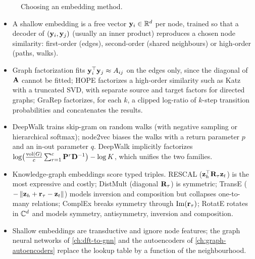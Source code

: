 \begin{notechapter}
\begin{figure}[htbp]
\caption{Choosing an embedding method.}
\end{figure}

\begin{chaptersummary}
\begin{itemize}
\item A shallow embedding is a free vector $\mathbf{y}_i \in \mathbb{R}^d$ per node, trained so that a decoder of $(\mathbf{y}_i, \mathbf{y}_j)$ (usually an inner product) reproduces a chosen node similarity: first-order (edges), second-order (shared neighbours) or high-order (paths, walks).
\item Graph factorization fits $\mathbf{y}_i^\top\mathbf{y}_j \approx A_{ij}$ on the edges only, since the diagonal of $\mathbf{A}$ cannot be fitted; HOPE factorizes a high-order similarity such as Katz with a truncated SVD, with separate source and target factors for directed graphs; GraRep factorizes, for each $k$, a clipped log-ratio of $k$-step transition probabilities and concatenates the results.
\item DeepWalk trains skip-gram on random walks (with negative sampling or hierarchical softmax); node2vec biases the walks with a return parameter $p$ and an in-out parameter $q$. DeepWalk implicitly factorizes $\log\bigl(\frac{\mathrm{vol}(G)}{c}\sum_{r=1}^c\mathbf{P}^r\mathbf{D}^{-1}\bigr) - \log K$, which unifies the two families.
\item Knowledge-graph embeddings score typed triples. RESCAL ($\mathbf{z}_h^\top\mathbf{R}_\tau\mathbf{z}_t$) is the most expressive and costly; DistMult (diagonal $\mathbf{R}_\tau$) is symmetric; TransE ($-\left\|\mathbf{z}_h + \mathbf{r}_\tau - \mathbf{z}_t\right\|$) models inversion and composition but collapses one-to-many relations; ComplEx breaks symmetry through $\mathrm{Im}(\mathbf{r}_\tau)$; RotatE rotates in $\mathbb{C}^d$ and models symmetry, antisymmetry, inversion and composition.
\item Shallow embeddings are transductive and ignore node features; the graph neural networks of \cref{ch:dft-to-gnn} and the autoencoders of \cref{ch:graph-autoencoders} replace the lookup table by a function of the neighbourhood.
\end{itemize}
\end{chaptersummary}


\end{notechapter}
